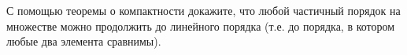 С помощью теоремы о компактности докажите, что любой частичный порядок на множестве можно продолжить до линейного порядка
(т.е. до порядка, в котором любые два элемента сравнимы).